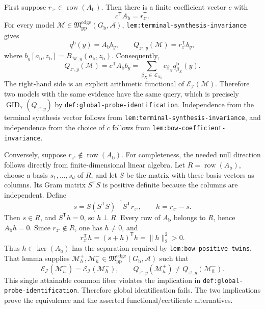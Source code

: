 First suppose \(r_{z^{\circ}}\in\operatorname{row}(A_{\mathrm b})\).  Then there is a finite coefficient vector \(c\) with
\[
 c^{\mathsf T}A_{\mathrm b}=r_{z^{\circ}}^{\mathsf T}.
\]
For every model \(\mathcal M\in\mathfrak M_{\mathrm{pp}}^{\mathrm{edge}}(G_{\mathrm b},\mathcal A)\), \texttt{lem:terminal-synthesis-invariance} gives
\[
 q^{\mathrm b}(y)=A_{\mathrm b}b_y,
 \qquad
 Q_{z^{\circ},y}(\mathcal M)=r_{z^{\circ}}^{\mathsf T}b_y,
\]
where \(b_y[a_{\mathrm b},z_{\mathrm b}]=B_{\mathcal M,y}(a_{\mathrm b},z_{\mathrm b})\).  Consequently,
\[
 Q_{z^{\circ},y}(\mathcal M)
 =c^{\mathsf T}A_{\mathrm b}b_y
 =\sum_{\beta_X\in\mathcal L_{X_{\mathrm b}}}
 c_{\beta_X}q^{\mathrm b}_{\beta_X}(y).
\]
The right-hand side is an explicit arithmetic functional of \(\mathcal E_{\mathcal I}(\mathcal M)\).  Therefore two models with the same evidence have the same query, which is precisely \(\operatorname{GID}_{\mathcal I}(Q_{z^{\circ},y})\) by \texttt{def:global-probe-identification}.  Independence from the terminal synthesis vector follows from \texttt{lem:terminal-synthesis-invariance}, and independence from the choice of \(c\) follows from \texttt{lem:bow-coefficient-invariance}.

Conversely, suppose \(r_{z^{\circ}}\notin\operatorname{row}(A_{\mathrm b})\).  For completeness, the needed null direction follows directly from finite-dimensional linear algebra.  Let \(R=\operatorname{row}(A_{\mathrm b})\), choose a basis \(s_1,\ldots,s_d\) of \(R\), and let \(S\) be the matrix with these basis vectors as columns.  Its Gram matrix \(S^{\mathsf T}S\) is positive definite because the columns are independent.  Define
\[
 s=S(S^{\mathsf T}S)^{-1}S^{\mathsf T}r_{z^{\circ}},
 \qquad h=r_{z^{\circ}}-s.
\]
Then \(s\in R\), and \(S^{\mathsf T}h=0\), so \(h\perp R\).  Every row of \(A_{\mathrm b}\) belongs to \(R\), hence \(A_{\mathrm b}h=0\).  Since \(r_{z^{\circ}}\notin R\), one has \(h\ne0\), and
\[
 r_{z^{\circ}}^{\mathsf T}h=(s+h)^{\mathsf T}h
 =\lVert h\rVert_2^2>0.
\]
Thus \(h\in\ker(A_{\mathrm b})\) has the separation required by \texttt{lem:bow-positive-twins}.  That lemma supplies \(\mathcal M_h^+,\mathcal M_h^-\in\mathfrak M_{\mathrm{pp}}^{\mathrm{edge}}(G_{\mathrm b},\mathcal A)\) such that
\[
 \mathcal E_{\mathcal I}(\mathcal M_h^+)=
 \mathcal E_{\mathcal I}(\mathcal M_h^-),
 \qquad
 Q_{z^{\circ},y}(\mathcal M_h^+)\ne
 Q_{z^{\circ},y}(\mathcal M_h^-).
\]
This single attainable common fiber violates the implication in \texttt{def:global-probe-identification}.  Therefore global identification fails.  The two implications prove the equivalence and the asserted functional/certificate alternatives.